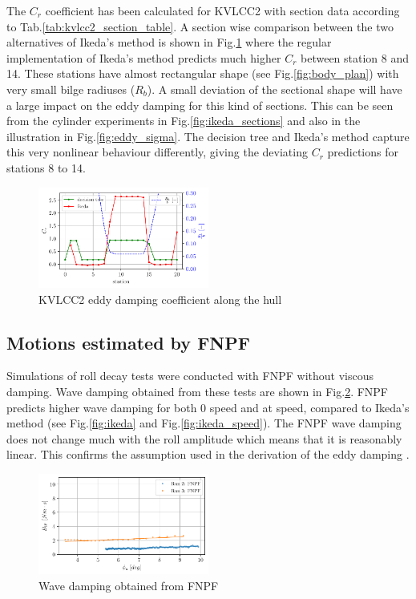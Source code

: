 The $C_r$ coefficient has been calculated for KVLCC2 with section data
according to Tab.\ref{tab:kvlcc2_section_table}. A section wise
comparison between the two alternatives of Ikeda's method is shown in
Fig.\ref{fig:kvlcc2_eddy} where the regular implementation of
Ikeda's method predicts much higher $C_r$ between station 8 and 14.
These stations have almost rectangular shape (see
Fig.\ref{fig:body_plan}) with very small bilge radiuses
($R_b$). A small deviation of the sectional shape will have a large
impact on the eddy damping for this kind of sections. This can be seen
from the cylinder experiments in Fig.\ref{fig:ikeda_sections}
and also in the illustration in Fig.\ref{fig:eddy_sigma}. The
decision tree and Ikeda's method capture this very nonlinear behaviour
differently, giving the deviating $C_r$ predictions for stations 8 to
14.
\begin{figure}[H]
\begin{center}\includegraphics[width = 0.5\textwidth]{figures/kvlcc2_eddy.pdf}\end{center}
\vspace{-1cm}
\caption{KVLCC2 eddy damping coefficient along the hull}
\label{fig:kvlcc2_eddy}
\end{figure}
\subsection*{Motions estimated by FNPF}\label{motions-estimated-by-fnpf}
Simulations of roll decay tests were conducted with FNPF without viscous
damping. Wave damping obtained from these tests are shown in
Fig.\ref{fig:fnpf}. FNPF predicts higher wave damping for both 0
speed and at speed, compared to Ikeda's method (see
Fig.\ref{fig:ikeda} and Fig.\ref{fig:ikeda_speed}). The
FNPF wave damping does not change much with the roll amplitude which
means that it is reasonably linear. This confirms the assumption used in
the derivation of the eddy damping \citep{7505983/4AFVVGNT}.
\begin{figure}[H]
\begin{center}\includegraphics[width = 0.5\textwidth]{figures/fnpf.pdf}\end{center}
\vspace{-1cm}
\caption{Wave damping obtained from FNPF}
\label{fig:fnpf}
\end{figure}
